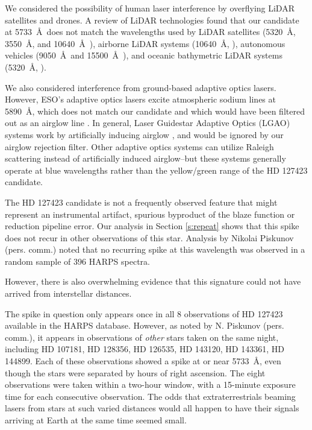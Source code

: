 \documentclass[twocolumn]{aastex701}
\begin{document}
We considered the possibility of human laser interference by overflying LiDAR satellites and drones.  A review of LiDAR technologies found that our candidate at 5733~\AA~does not match the wavelengths used by LiDAR satellites (5320~\AA, 3550~\AA, and 10640~\AA~\citep{lidar_history}), airborne LiDAR systems (10640~\AA, \citep{lidar_history}), autonomous vehicles (9050~\AA~and 15500~\AA~\citep{vehicle_lidar}), and oceanic bathymetric LiDAR systems (5320~\AA, \citep{bathymetric_lidar}). 

We also considered interference from ground-based adaptive optics lasers. However, ESO's adaptive optics lasers excite atmospheric sodium lines at 5890~\AA, which does not match our candidate and which would have been filtered out as an airglow line \citep{HARPS_guidestars}. In general, Laser Guidestar Adaptive Optics (LGAO) systems work by artificially inducing airglow \citep{LaserGuideStarAdaptiveOptics}, and would be ignored by our airglow rejection filter.  Other adaptive optics systems can utilize Raleigh scattering instead of artificially induced airglow--but these systems generally operate at blue wavelengths \citep{RaleighScattering} rather than the yellow/green range of the HD 127423 candidate.

The HD 127423 candidate is not a frequently observed feature that might represent an instrumental artifact, spurious byproduct of the blaze function or reduction pipeline error.  Our analysis in Section \ref{s:repeat} shows that this spike does not recur in other observations of this star.  Analysis by Nikolai Piskunov (pers. comm.) noted that no recurring spike at this wavelength was observed in a random sample of 396 HARPS spectra. 

However, there is also overwhelming evidence that this signature could not have arrived from interstellar distances.  

The spike in question only appears once in all 8 observations of HD 127423 available in the HARPS database. However, as noted by N. Piskunov (pers. comm.), it appears in observations of \emph{other} stars taken on the same night, including HD 107181, HD 128356, HD 126535, HD 143120, HD 143361, HD 144899.  Each of these observations showed a spike at or near 5733~\AA, even though the stars were separated by hours of right ascension. The eight observations were taken within a two-hour window, with a 15-minute exposure time for each consecutive observation. The odds that extraterrestrials beaming lasers from stars at such varied distances would all happen to have their signals arriving at Earth at the same time seemed small. 
\end{document}
